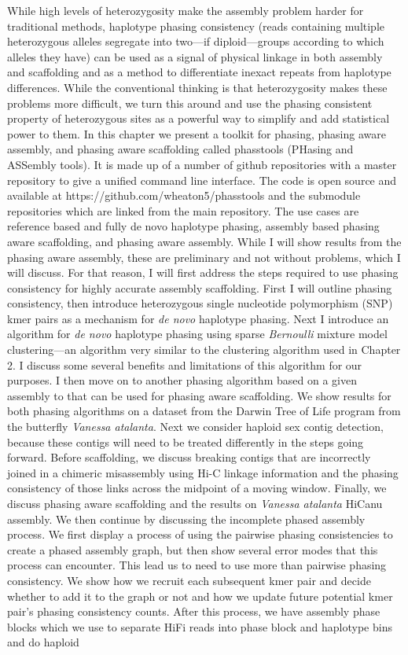 \par{
While high levels of heterozygosity make the assembly problem harder for traditional methods, haplotype phasing consistency (reads containing multiple heterozygous alleles segregate into two---if diploid---groups according to which alleles they have) can be used as a signal of physical linkage in both assembly and scaffolding and as a method to differentiate inexact repeats from haplotype differences. While the conventional thinking is that heterozygosity makes these problems more difficult, we turn this around and use the phasing consistent property of heterozygous sites as a powerful way to simplify and add statistical power to them. In this chapter we present a toolkit for phasing, phasing aware assembly, and phasing aware scaffolding called phasstools (PHasing and ASSembly tools). It is made up of a number of github repositories with a master repository to give a unified command line interface. The code is open source and available at https://github.com/wheaton5/phasstools and the submodule repositories which are linked from the main repository. The use cases are reference based and fully de novo haplotype phasing, assembly based phasing aware scaffolding, and phasing aware assembly. While I will show results from the phasing aware assembly, these are preliminary and not without problems, which I will discuss. For that reason, I will first address the steps required to use phasing consistency for highly accurate assembly scaffolding. First I will outline phasing consistency, then introduce heterozygous single nucleotide polymorphism (SNP) kmer pairs as a mechanism for \textit{de novo} haplotype phasing. Next I introduce an algorithm for \textit{de novo} haplotype phasing using sparse \textit{Bernoulli} mixture model clustering---an algorithm very similar to the clustering algorithm used in Chapter 2. I discuss some several benefits and limitations of this algorithm for our purposes. I then move on to another phasing algorithm based on a given assembly to that can be used for phasing aware scaffolding. We show results for both phasing algorithms on a dataset from the Darwin Tree of Life program from the butterfly \textit{Vanessa atalanta}. Next we consider haploid sex contig detection, because these contigs will need to be treated differently in the steps going forward. Before scaffolding, we discuss breaking contigs that are incorrectly joined in a chimeric misassembly using Hi-C linkage information and the phasing consistency of those links across the midpoint of a moving window. Finally, we discuss phasing aware scaffolding and the results on \textit{Vanessa atalanta} HiCanu assembly. We then continue by discussing the incomplete phased assembly process. We first display a process of using the pairwise phasing consistencies to create a phased assembly graph, but then show several error modes that this process can encounter. This lead us to need to use more than pairwise phasing consistency. We show how we recruit each subsequent kmer pair and decide whether to add it to the graph or not and how we update future potential kmer pair's phasing consistency counts. After this process, we have assembly phase blocks which we use to separate HiFi reads into phase block and haplotype bins and do haploid }
